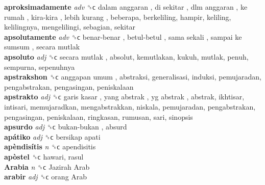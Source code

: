 \textbf{aproksimadamente} \emph{adv}  ␝ϲ   dalam anggaran ,  di sekitar ,  dlm anggaran ,  ke rumah ,  kira-kira ,  lebih kurang , beberapa, berkeliling, hampir, keliling, kelilingnya, mengelilingi, sebagian, sekitar  \\
\textbf{apsolutamente} \emph{adv}  ␝ϲ   benar-benar ,  betul-betul ,  sama sekali ,  sampai ke sumsum ,  secara mutlak   \\
\textbf{apsoluto} \emph{adj}  ␝ϲ   secara mutlak , absolut, kemutlakan, kukuh, mutlak, penuh, sempurna, sepenuhnya  \\
\textbf{apstrakshon} ␝ϲ   anggapan umum , abstraksi, generalisasi, induksi, pemujaradan, pengabstrakan, pengasingan, peniskalaan  \\
\textbf{apstrakto} \emph{adj}  ␝ϲ   garis kasar ,  yang abstrak ,  yg abstrak , abstrak, ikhtisar, intisari, memujaradkan, mengabstrakkan, niskala, pemujaradan, pengabstrakan, pengasingan, peniskalaan, ringkasan, rumusan, sari, sinopsis  \\
\textbf{apsurdo} \emph{adj}  ␝ϲ   bukan-bukan , absurd  \\
\textbf{apátiko} \emph{adj}  ␝ϲ   bersikap apati   \\
\textbf{apèndisítis} \emph{n}  ␝ϲ  apendisitis  \\
\textbf{apòstel} ␝ϲ  hawari, rasul  \\
\textbf{Arabia} \emph{n}  ␝ϲ   Jazirah Arab   \\
\textbf{arabir} \emph{adj}  ␝ϲ   orang Arab   \\
